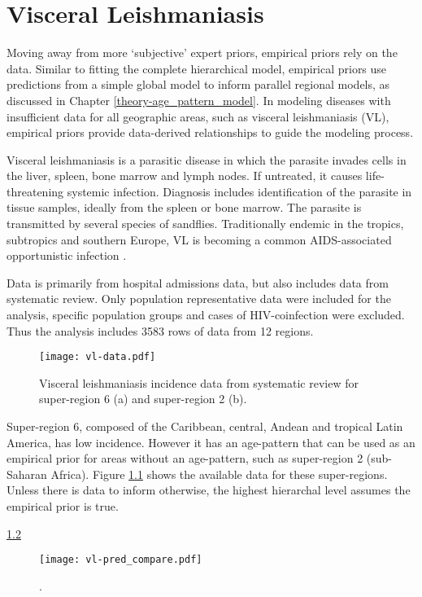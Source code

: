 \chapter{Visceral Leishmaniasis}
\label{applications-priors_empirical}

Moving away from more `subjective' expert priors, empirical priors rely on the data.  Similar to fitting the complete hierarchical model, empirical priors use predictions from a simple global model to inform parallel regional models, as discussed in Chapter \ref{theory-age_pattern_model}.  In modeling diseases with insufficient data for all geographic areas, such as visceral leishmaniasis (VL), empirical priors provide data-derived relationships to guide the modeling process.

Visceral leishmaniasis is a parasitic disease in which the parasite invades cells in the liver, spleen, bone marrow and lymph nodes.  If untreated, it causes life-threatening systemic infection.  Diagnosis includes identification of the parasite in tissue samples, ideally from the spleen or bone marrow.  The parasite is transmitted by several species of sandflies.  Traditionally  endemic in the tropics, subtropics and southern Europe, VL is becoming a common AIDS-associated opportunistic infection \cite{herwaldt_leishmaniasis_1999, zeledon_hemoflagellates_1996}.

Data is primarily from hospital admissions data, but also includes data from systematic review.  Only population representative data were included for the analysis, specific population groups and cases of HIV-coinfection were excluded.  Thus the analysis includes 3583 rows of data from 12 regions.

    \begin{figure}[h]
        \begin{center}
            \texttt{[image: vl-data.pdf]}
            \caption{Visceral leishmaniasis incidence data from systematic review for super-region 6 (a) and super-region 2 (b).}
            \label{fig:app-vl data}
        \end{center}
    \end{figure}

Super-region 6, composed of the Caribbean, central, Andean and tropical Latin America, has low incidence.  However it has an age-pattern that can be used as an empirical prior for areas without an age-pattern, such as super-region 2 (sub-Saharan Africa).  Figure \ref{fig:app-vl data} shows the available data for these super-regions.  Unless there is data to inform otherwise, the highest hierarchal level assumes the empirical prior is true.



\ref{fig:app-vl pred compare}

    \begin{figure}[h]
        \begin{center}
            \texttt{[image: vl-pred\_compare.pdf]}
            \caption{.}
            \label{fig:app-vl pred compare}
        \end{center}
    \end{figure} 